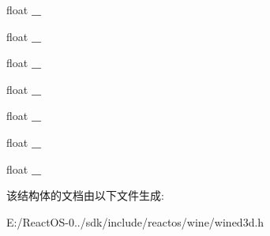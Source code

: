 \begin{DoxyCompactItemize}
float {\bfseries \+\_}
\item 
\mbox{\label{structwined3d__matrix_a39c8a44ff0de58372ed4a4ea55371187}} 
float {\bfseries \+\_}
\item 
\mbox{\label{structwined3d__matrix_a6b711e8ad365de44f58114e93473eed0}} 
float {\bfseries \+\_}
\item 
\mbox{\label{structwined3d__matrix_ab816ee6869d45c988b5c92f3f1abbb9a}} 
float {\bfseries \+\_}
\item 
\mbox{\label{structwined3d__matrix_ae0a13766c6634372f8dc8537a42f37e9}} 
float {\bfseries \+\_}
\item 
\mbox{\label{structwined3d__matrix_a5b4d6e1608df79c2124f56fad6312dd0}} 
float {\bfseries \+\_}
\item 
\mbox{\label{structwined3d__matrix_a4aae43dd4bb68bef26c0f25ede55e213}} 
float {\bfseries \+\_}
\end{DoxyCompactItemize}


该结构体的文档由以下文件生成\+:\begin{DoxyCompactItemize}
\item 
E\+:/\+React\+O\+S-\/0../sdk/include/reactos/wine/wined3d.\+h\end{DoxyCompactItemize}
